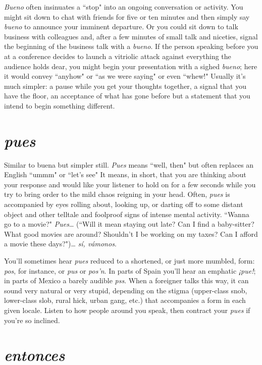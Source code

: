 \emph{Bueno} often insinuates a ``stop" into an ongoing conversation
or activity. You might sit down to chat with friends for five or ten minutes and then simply say \emph{bueno} to announce your imminent departure. Or you could sit down to talk business with colleagues and, after
a few minutes of small talk and niceties, signal the beginning of the
business talk with a \emph{bueno}. If the person speaking before you at a conference decides to launch a vitriolic attack against everything the audience holds dear, you might begin your presentation with a sighed
\emph{bueno}; here it would convey ``anyhow" or ``as we were saying" or
even ``whew!" Usually it's much simpler: a pause while you get your
thoughts together, a signal that you have the floor, an acceptance of
what has gone before but a statement that you intend to begin something different.

\section{\emph{pues}}

Similar to buena but simpler still. \emph{Pues} means ``well, then"
but often replaces an English ``ummm" or ``let's see" It means, in
short, that you are thinking about your response and would like your
listener to hold on for a few seconds while you try to bring order to the
mild chaos reigning in your head. Often, \emph{pues} is accompanied by eyes
rolling about, looking up, or darting off to some distant object and
other telltale and foolproof signs of intense mental activity. ``Wanna
go to a movie?" \emph{Pues}\ldots{} (``Will it mean staying out late? Can I find a
baby-sitter? What good movies are around? Shouldn't I be working on
my taxes? Can I afford a movie these days?")\ldots{} \emph{sí, vámonos}.

You'll sometimes hear \emph{pues} reduced to a shortened, or just
more mumbled, form: \emph{pos}, for instance, or \emph{pus} or \emph{pos'n}. In parts of
Spain you'll hear an emphatic \emph{¡pue!}; in parts of Mexico a barely audible \emph{pss}. When a foreigner talks this way, it can sound very natural
or very stupid, depending on the stigma (upper-class snob, lower-class
slob, rural hick, urban gang, etc.) that accompanies a form in each
given locale. Listen to how people around you speak, then contract
your \emph{pues} if you're so inclined.

\section{\emph{entonces}}

